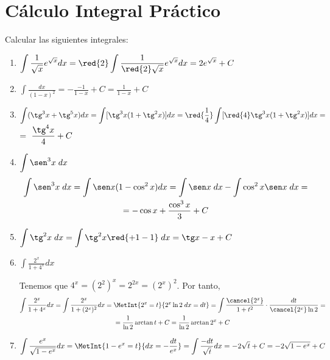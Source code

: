 \section{Cálculo Integral Práctico}

\renewcommand{\labelenumi}{\alph{enumi})}
\begin{ejercicio}\label{Ejercicio.Ej1}
Calcular las siguientes integrales:
\begin{enumerate}
    \item $\displaystyle \int \frac{1}{\sqrt{x}}e^{\sqrt{x}}dx = \red{2}\int \frac{1}{\red{2}\sqrt{x}}e^{\sqrt{x}}dx = 2e^{\sqrt{x}} +C$

    \item $\displaystyle \int \frac{dx}{(1-x)^2} = -\frac{-1}{1-x} +C = \frac{1}{1-x} +C$

    \item $\displaystyle \int (\tg^3x + \tg^5x) dx
    = \int [\tg^3x(1+\tg^2x)]dx
    = \red{\frac{1}{4}}\int [\red{4}\tg^3x(1+\tg^2x)]dx =$ $=~\dfrac{\tg^4x}{4} +C$

    \item $\displaystyle \int \sen^3 x\; dx$
    \begin{multline*}
        \int \sen^3 x\; dx
        = \int \sen x (1-\cos^2 x)dx
        = \int \sen x\;dx -\int \cos^2x\sen x\;dx =\\= -\cos x +\frac{\cos^3x}{3}+C
    \end{multline*}

    \item $\displaystyle \int \tg^2x\;dx = \int \tg^2x \red{+1-1}\;dx = \tg x -x + C$

    \item $\displaystyle \int \frac{2^x}{1+4^x}dx$

    Tenemos que $4^x = (2^2)^x = 2^{2x} = (2^x)^2$. Por tanto,
    \begin{multline*}
        \int \frac{2^x}{1+4^x}dx
        = \int \frac{2^x}{1+(2^x)^2}dx
        = \MetInt{2^x=t}{2^x\ln 2\;dx = dt}
        =\int \frac{\cancel{2^x}}{1+t^2}\cdot \frac{dt}{\cancel{2^x}\ln 2}
        =\\= \frac{1}{\ln 2}\arctan t + C
        = \frac{1}{\ln 2}\arctan 2^x + C
    \end{multline*}

    \item $\displaystyle \int \frac{e^x}{\sqrt{1-e^x}}dx = \MetInt{1-e^x = t}{dx = -\frac{dt}{e^x}}
    = \int \frac{-dt}{\sqrt{t}}dx = -2\sqrt{t} +C = -2\sqrt{1-e^x}+C$


\end{enumerate}
\end{ejercicio}
